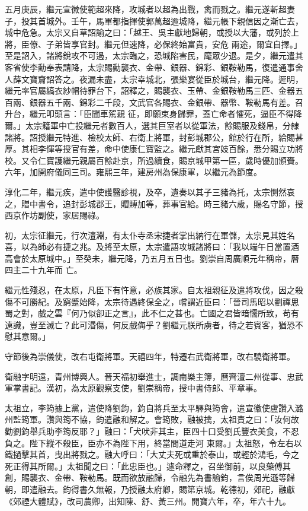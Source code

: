 \begin{pinyinscope}
 五月庚辰，繼元宣徽使範超來降，攻城者以超為出戰，禽而戮之。繼元遂斬超妻子，投其首城外。壬午，馬軍都指揮使郭萬超逾城降，繼元帳下親信因之漸亡去，城中危急。太宗又自草詔諭之曰：「越王、吳主獻地歸朝，或授以大藩，或列於上將，臣僚、子弟皆享官封。繼元但速降，必保終始富貴，安危
 兩途，爾宜自擇。」至是詔入，諸將銳攻不可遏，太宗臨之，恐城陷害民，麾眾少退。是夕，繼元遣其客省使李勳奉表請降，太宗賜勳襲衣、金帶、銀器、錦彩、銀鞍勒馬，復遣通事舍人薛文寶齎詔答之。夜漏未盡，太宗幸城北，張樂宴從臣於城台，繼元降。遲明，繼元率官屬縞衣紗帽待罪台下，詔釋之，賜襲衣、玉帶、金銀鞍勒馬三匹、金器五百兩、銀器五千兩、錦彩二千段，文武官各賜衣、金銀帶、器幣、鞍勒馬有差。召升台，繼元叩頭言：「臣聞車駕親
 征，即願束身歸罪，蓋亡命者懼死，逼臣不得降爾。」太宗籍軍中亡投繼元者數百人，選其巨室者以從軍法，餘賜服及錢帛，分隸諸將。詔授繼元特進、檢校太師、右衛上將軍，封彭城郡公，館於行在所，給賜甚厚。其相李惲等授官有差，命中使康仁寶監之。繼元獻其宮妓百餘，悉分賜立功將校。又令仁寶護繼元親屬百餘赴京，所過續食，賜京城甲第一區，歲時優加頒賚。六年，加開府儀同三司。雍熙三年，建房州為保康軍，以繼元為節度。



 淳化二年，繼元疾，遣中使護醫診視，及卒，遺奏以其子三豬為托，太宗惻然哀之，贈中書令，追封彭城郡王，賵賻加等，葬事官給。時三豬六歲，賜名守節，授西京作坊副使，家居賜祿。



 初，太宗征繼元，行次澶淵，有太仆寺丞宋捷者掌出納行在軍儲，太宗見其姓名喜，以為師必有捷之兆。及將至太原，太宗遣語攻城諸將曰：「我以端午日當置酒高會於太原城中。」至癸未，繼元降，乃五月五日也。劉崇自周廣順元年稱帝，曆四主二十九年而
 亡。



 繼元性殘忍，在太原，凡臣下有忤意，必族其家。自太祖親征及遣將攻伐，因之殺傷不可勝紀。及窮蹙始降，太宗待遇終保全之，嚐謂近臣曰：「晉司馬昭以劉禪思蜀之對，戲之雲『何乃似卻正之言』，此不仁之甚也。亡國之君皆暗懦所致，苟有遠識，豈至滅亡？此可湣傷，何反戲侮乎？劉繼元朕所虜者，待之若賓客，猶恐不慰其意爾。」



 守節後為崇儀使，改右屯衛將軍。天禧四年，特遷右武衛將軍，改右驍衛將軍。



 衛融字明遠，青州博興人。晉天福初舉進士，調南樂主簿，曆齊澶二州從事、忠武軍掌書記。漢初，為太原觀察支使，劉崇稱帝，授中書侍郎、平章事。



 太祖立，李筠據上黨，遣使降劉鈞，鈞自將兵至太平驛與筠會，遣宣徽使盧讚入潞州監筠軍。讚與筠不協，鈞遣融和解之。會筠敗，融被擒，太祖責之曰：「汝何故勸劉鈞舉兵助李筠反耶？」融曰：「犬吠非其主，臣四十口受劉氏豐衣美食，不忍負之。陛下縱不殺臣，臣亦不為陛下用，終當間道走河
 東爾。」太祖怒，令左右以鐵撾擊其首，曳出將戮之。融大呼曰：「大丈夫死或重於泰山，或輕於鴻毛，今之死正得其所爾。」太祖聞之曰：「此忠臣也。」遽命釋之，召坐御前，以良藥傅其創，賜襲衣、金帶、鞍勒馬。既而欲放融歸，令融先為書諭鈞，言俟周光遜等歸朝，即遣融去。鈞得書久無報，乃授融太府卿，賜第京城。乾德初，郊祀，融獻《郊禋大體賦》，改司農卿，出知陳、舒、黃三州。開寶六年，卒，年六十九。




\end{pinyinscope}
